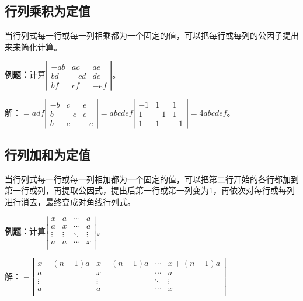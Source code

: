 \documentclass[UTF8, 12pt]{ctexart}
\begin{document}
\subsection{行列乘积为定值}

当行列式每一行或每一列相乘都为一个固定的值，可以把每行或每列的公因子提出来来简化计算。

\textbf{例题：}计算$\left|\begin{array}{ccc} 
    -ab & ac & ae \\
    bd & -cd & de \\
    bf & cf & -ef
\end{array}\right|$。

解：$=adf\left|\begin{array}{ccc} 
    -b & c & e \\
    b & -c & e \\
    b & c & -e
\end{array}\right|
=abcdef\left|\begin{array}{ccc} 
    -1 & 1 & 1 \\
    1 & -1 & 1 \\
    1 & 1 & -1
\end{array}\right|=4abcdef$。

\subsection{行列加和为定值}

当行列式每一行或每一列相加都为一个固定的值，可以把第二行开始的各行都加到第一行或列，再提取公因式，提出后第一行或第一列变为1，再依次对每行或每列进行消去，最终变成对角线行列式。

\textbf{例题：}计算$\left|\begin{array}{cccc} 
    x & a & \cdots & a \\
    a & x & \cdots & a \\
    \vdots & \vdots & \ddots & \vdots \\
    a & a & \cdots & x \\
\end{array}\right|$。

解：$=\left|\begin{array}{cccc} 
    x+(n-1)a & x+(n-1)a & \cdots & x+(n-1)a \\
    a & x & \cdots & a \\
    \vdots & \vdots & \ddots & \vdots \\
    a & a & \cdots & x \\
\end{array}\right|$
\end{document}
